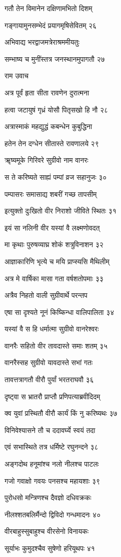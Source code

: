 गतौ तेन विमानेन दक्षिणामभितो दिशम्

गङ्गायामुनसम्भेदं प्रयागमृषिसेवितम् २६

अभिवाद्य भरद्वाजमत्रेराश्रममीयतुः

सम्भाष्य च मुनींस्तत्र जनस्थानमुपागतौ २७

राम उवाच

अत्र पूर्वं हृता सीता रावणेन दुरात्मना

हत्वा जटायुषं गृध्रं योसौ पितृसखो हि नौ २८

अत्रास्माकं महद्युद्धं कबन्धेन कुबुद्धिना

हतेन तेन दग्धेन सीतास्ते रावणालये २९

ॠष्यमूके गिरिवरे सुग्रीवो नाम वानरः

स ते करिष्यते साह्यं पम्पां व्रज सहानुजः ३०

पम्पासरः समासाद्य शबरीं गच्छ तापसीम्

इत्युक्तो दुःखितो वीर निराशो जीविते स्थितः ३१

इयं सा नलिनी वीर यस्यां वै लक्ष्मणोवदत्

मा कृथाः पुरुषव्याघ्र शोकं शत्रुविनाशन ३२

आज्ञाकारिणि भृत्ये च मयि प्राप्स्यसि मैथिलीम्

अत्र मे वार्षिका मासा गता वर्षशतोपमाः ३३

अत्रैव निहतो वाली सुग्रीवार्थे परन्तप

एषा सा दृश्यते नूनं किष्किन्धा वालिपालिता ३४

यस्यां वै स हि धर्मात्मा सुग्रीवो वानरेश्वरः

वानरैः सहितो वीर तावदास्ते समाः शतम् ३५

वानरैस्सह सुग्रीवो यावदास्ते सभां गतः

तावत्तत्रागतौ वीरौ पुर्यां भरतराघवौ ३६

दृष्ट्वा स भ्रातरौ प्राप्तौ प्रणिपत्याब्रवीदिदम्

क्व युवां प्रस्थितौ वीरौ कार्यं किं नु करिष्यथः ३७

विनिवेश्यासने तौ च ददावर्घ्ये स्वयं तदा

एवं सभास्थिते तत्र धर्मिष्टे रघुनन्दने ३८

अङ्गदोथ हनूमांश्च नलो नीलश्च पाटलः

गजो गवाक्षो गवयः पनसश्च महायशाः ३९

पुरोधसो मन्त्रिणश्च दैवज्ञो दधिवक्रकः

नीलश्शतबलिर्मैन्दो द्विविदो गन्धमादनः ४०

वीरबाहुस्सुबाहुश्च वीरसेनो विनायकः

सूर्याभः कुमुदश्चैव सुषेणो हरियूथपः ४१

